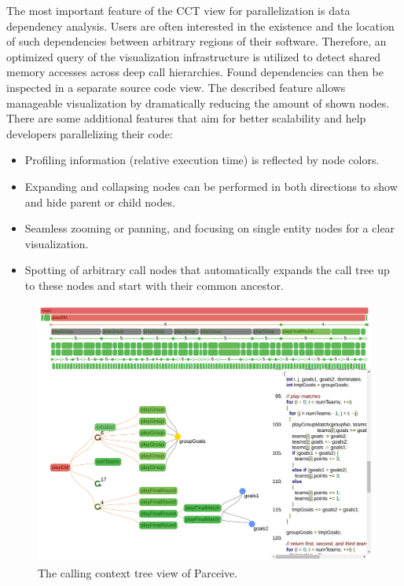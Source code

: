 The most important feature of the CCT view for parallelization is data
dependency analysis. Users are often interested in the existence and the
location of such dependencies between arbitrary regions of their software.
Therefore, an optimized query of the visualization infrastructure is utilized
to detect shared memory accesses across deep call hierarchies. Found
dependencies can then be inspected in a separate source code view. The
described feature allows manageable visualization by dramatically reducing the
amount of shown nodes. There are some additional features that aim for better
scalability and help developers parallelizing their code:

\begin{itemize}
	\item Profiling information (relative execution time) is reflected by node
colors.
	\item Expanding and collapsing nodes can be performed in both
directions to show and hide parent or child nodes.
	\item Seamless zooming or panning, and focusing on single entity nodes for
a clear visualization.
	\item Spotting of arbitrary call nodes that automatically expands the call
tree up to these nodes and start with their common ancestor.
\end{itemize}

\begin{figure}[h!]
\includegraphics[clip, trim=0.9cm 2.5cm 8.5cm 8.5cm,
width=\linewidth]{img/cct_view}
\caption{The calling context tree view of Parceive.}
\label{fig:cct_view}	
\end{figure}


